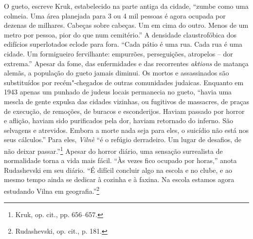 O gueto, escreve Kruk, estabelecido na parte antiga da cidade, ``zumbe
como uma colmeia. Uma área planejada para 3 ou 4 mil pessoas é agora
ocupada por dezenas de milhares. Cabeças sobre cabeças. Um em cima do
outro. Menos de um metro por pessoa, pior do que num cemitério.'' A
densidade claustrofóbica dos edifícios superlotados eclode para fora.
``Cada pátio é uma rua. Cada rua é uma cidade. Um formigueiro
fervilhante: empurrões, perseguições, atropelos -- dor extrema.'' Apesar
da fome, das enfermidades e das recorrentes \textit{aktions} de matança
alemãs, a população do gueto jamais diminui. Os mortos e assassinados
são substituídos por recém"-chegados de outras comunidades judaicas.
Enquanto em 1943 apenas um punhado de judeus locais permanecia no gueto,
``havia uma mescla de gente expulsa das cidades vizinhas, ou fugitivos
de massacres, de praças de execução, de remoções, de buracos e
esconderijos. Haviam passado por horror e aflição, haviam sido
purificados pela dor, haviam retornado do inferno. São selvagens e
atrevidos. Embora a morte nada seja para eles, o suicídio não está nos
seus cálculos.'' Para eles, \textit{Vilnè} ``é o refúgio derradeiro. Um lugar de
desafios, de não deixar passar.''\footnote{Kruk, op. cit., pp. 656--657.}
Apesar do horror diário, uma sensação surrealista de normalidade torna a
vida mais fácil. ``Às vezes fico ocupado por horas,'' anota Rudashevski
em seu diário. ``É difícil concluir algo na escola e no clube, e ao
mesmo tempo ainda se dedicar à cozinha e à faxina. Na escola estamos
agora estudando Vilna em geografia.''\footnote{Rudashevski, op. cit., p. 181.}

